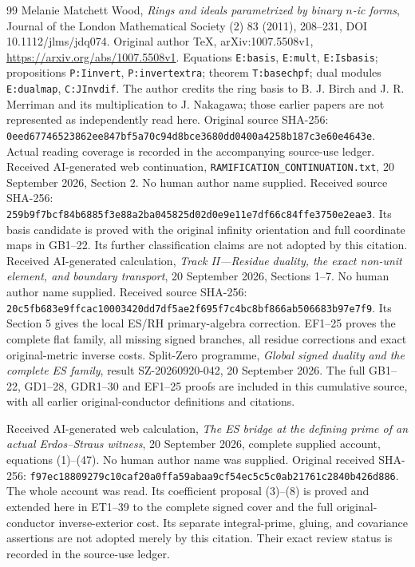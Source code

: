 \documentclass[11pt]{article}
\begin{document}
\begin{thebibliography}{99}
 Melanie Matchett Wood,
\emph{Rings and ideals parametrized by binary $n$-ic forms},
Journal of the London Mathematical Society (2) 83 (2011), 208--231,
DOI 10.1112/jlms/jdq074. Original author TeX, arXiv:1007.5508v1,
\url{https://arxiv.org/abs/1007.5508v1}.
Equations \texttt{E:basis}, \texttt{E:mult}, \texttt{E:Isbasis};
propositions \texttt{P:Iinvert}, \texttt{P:invertextra};
theorem \texttt{T:basechpf}; dual modules \texttt{E:dualmap},
\texttt{C:JInvdif}. The author credits the ring basis to B. J. Birch
and J. R. Merriman and its multiplication to J. Nakagawa; those
earlier papers are not represented as independently read here.
Original source SHA-256:
\texttt{0eed67746523862ee847bf5a70c94d8bce3680dd0400a4258b187c3e60e4643e}.
Actual reading coverage is recorded in the accompanying source-use ledger.
 Received AI-generated web continuation,
\texttt{RAMIFICATION\_CONTINUATION.txt}, 20 September 2026,
Section 2. No human author name supplied. Received source SHA-256:
\texttt{259b9f7bcf84b6885f3e88a2ba045825d02d0e9e11e7df66c84ffe3750e2eae3}.
Its basis candidate is proved with the original infinity orientation
and full coordinate maps in GB1--22. Its further classification claims
are not adopted by this citation.
 Received AI-generated calculation,
\emph{Track II---Residue duality, the exact non-unit element,
and boundary transport}, 20 September 2026, Sections 1--7.
No human author name supplied. Received source SHA-256:
\texttt{20c5fb683e9ffcac10003420dd7df5ae2f695f7c4bc8bf866ab506683b97e7f9}.
Its Section 5 gives the local ES/RH primary-algebra correction.
EF1--25 proves the complete flat family, all missing signed branches,
all residue corrections and exact original-metric inverse costs.
 Split-Zero programme,
\emph{Global signed duality and the complete ES family},
result SZ-20260920-042, 20 September 2026. The full GB1--22,
GD1--28, GDR1--30 and EF1--25 proofs are included in this cumulative
source, with all earlier original-conductor definitions and citations.

 Received AI-generated web calculation,
\emph{The ES bridge at the defining prime of an actual Erdos--Straus witness},
20 September 2026, complete supplied account, equations (1)--(47).
No human author name was supplied.
Original received SHA-256: \texttt{f97ec18809279c10caf20a0ffa59abaa9cf54ec5c5c0ab21761c2840b426d886}.
The whole account was read. Its coefficient proposal (3)--(8) is
proved and extended here in ET1--39 to the complete signed cover and
the full original-conductor inverse-exterior cost.
Its separate integral-prime, gluing, and covariance assertions are not
adopted merely by this citation. Their exact review status is recorded
in the source-use ledger.

\end{thebibliography}
\end{document}
